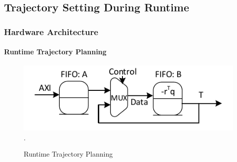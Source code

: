 \documentclass{beamer}
\begin{document}
\subsection{Trajectory Setting During Runtime}
\begin{frame}
\frametitle{Hardware Architecture}
\framesubtitle{Runtime Trajectory Planning}
\begin{figure}[t]
\centering
\captionsetup{justification=centering}
\includegraphics[scale=.75]{../ASAP_17/figure/trajectoryProfile.pdf}
\DeclareGraphicsExtensions.
\caption{Runtime Trajectory Planning\label{fig_traj}}
\end{figure}
\end{frame}


\end{document}
